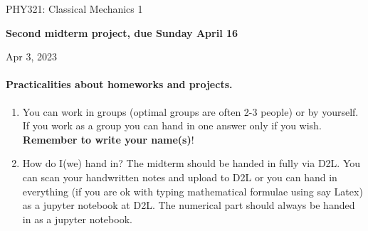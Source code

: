 \documentclass[%
oneside,                 %
final,                   %
10pt]{article}
\begin{document}

\newcommand{\exercisesection}[1]{\subsection*{#1}}






\thispagestyle{empty}

\begin{center}
{\LARGE\bf
\begin{spacing}{1.25}
PHY321: Classical Mechanics 1
\end{spacing}
}
\end{center}


\begin{center}
{\bf Second midterm project, due Sunday  April 16${}^{}$} \\ [0mm]
\end{center}

\begin{center}
\end{center}
    

\begin{center}
Apr 3, 2023
\end{center}

\vspace{1cm}


\paragraph{Practicalities about  homeworks and projects.}
\begin{enumerate}
\item You can work in groups (optimal groups are often 2-3 people) or by yourself. If you work as a group you can hand in one answer only if you wish. \textbf{Remember to write your name(s)}!

\item How do I(we)  hand in?  The midterm should be handed in fully via D2L. You can scan your handwritten notes and upload to D2L or you can hand in everything (if you are ok with typing mathematical formulae using say Latex) as a jupyter notebook at D2L. The numerical part should always be handed in as a jupyter notebook.
\end{enumerate}
\end{document}
